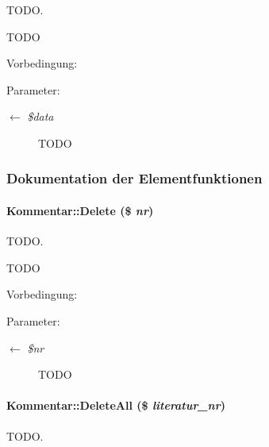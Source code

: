 TODO. 

TODO \begin{Desc}
\item[Vorbedingung:]\end{Desc}
\begin{Desc}
\item[Parameter:]
\begin{description}
\item[\mbox{$\leftarrow$} {\em \$data}]TODO \end{description}
\end{Desc}


\subsubsection{Dokumentation der Elementfunktionen}
\hypertarget{classKommentar_31c1fdfb4fb8f24e0016c8ddb98ddcdc}{
\paragraph[Delete]{\setlength{\rightskip}{0pt plus 5cm}Kommentar::Delete (\$ {\em nr})}\hfill}
\label{classKommentar_31c1fdfb4fb8f24e0016c8ddb98ddcdc}


TODO. 

TODO \begin{Desc}
\item[Vorbedingung:]\end{Desc}
\begin{Desc}
\item[Parameter:]
\begin{description}
\item[\mbox{$\leftarrow$} {\em \$nr}]TODO \end{description}
\end{Desc}
\hypertarget{classKommentar_9903f1df98f71eefa3b44a81d6a8ee5c}{
\paragraph[DeleteAll]{\setlength{\rightskip}{0pt plus 5cm}Kommentar::Delete\-All (\$ {\em literatur\_\-nr})}\hfill}
\label{classKommentar_9903f1df98f71eefa3b44a81d6a8ee5c}


TODO. 


